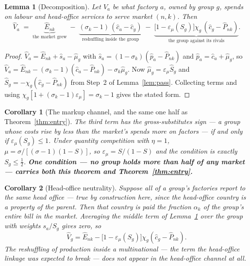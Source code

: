 \documentclass[11pt]{article}
\theoremstyle{plain}
\newtheorem{lemma}{Lemma}
\newtheorem{corollary}{Corollary}
\theoremstyle{remark}
\theoremstyle{definition}
\begin{document}
\begin{lemma}[Decomposition]\label{lem:decomp}
Let $V_a$ be what factory $a$, owned by group $g$, spends on labour and head-office
services to serve market $(n,k)$. Then
\[
  \hat V_a \;=\;
  \underbrace{\hat E_{nk}}_{\text{the market grew}}
  \;-\;\underbrace{(\sigma_k-1)\,(\hat c_a-\hat c_g)}_{\text{reshuffling inside the group}}
  \;-\;\underbrace{\big[1-\varepsilon_\mu(S_g)\big]\chi_g\,(\hat c_g-\hat P_{nk})}_{\text{the group against its rivals}} .
\]
\end{lemma}

\begin{proof}
$\hat V_a=\hat E_{nk}+\hat s_a-\hat\mu_g$ with $\hat s_a=(1-\sigma_k)(\hat p_a-\hat
P_{nk})$ and $\hat p_a=\hat c_a+\hat\mu_g$, so $\hat V_a=\hat E_{nk}
-(\sigma_k-1)(\hat c_a-\hat P_{nk})-\sigma_k\hat\mu_g$. Now
$\hat\mu_g=\varepsilon_\mu\hat S_g$ and $\hat S_g=-\chi_g(\hat c_g-\hat P_{nk})$ from
Step~2 of Lemma~\ref{lem:pass}. Collecting terms and using
$\chi_g[1+(\sigma_k-1)\varepsilon_\mu]=\sigma_k-1$ gives the stated form.
\end{proof}

\begin{corollary}[The markup channel, and the same one half as Theorem~\ref{thm:entry}]
\label{cor:half}
The third term has the gross-substitutes sign --- a group whose costs rise by less than
the market's spends \emph{more} on factors --- if and only if
$\varepsilon_\mu(S_g)\le1$. Under quantity competition with $\eta=1$,
$\mu=\sigma/[(\sigma-1)(1-S)]$, so $\varepsilon_\mu=S/(1-S)$ and the condition is
exactly $S_g\le\frac12$. \textbf{One condition --- no group holds more than half of any
market --- carries both this theorem and Theorem~\ref{thm:entry}.}
\end{corollary}

\begin{corollary}[Head-office neutrality]\label{cor:hqneutral}
Suppose all of a group's factories report to the same head office --- true by
construction here, since the head-office country is a property of the parent. Then
that country is paid the fraction $\alpha_k$ of the group's \emph{entire} bill in the
market. Averaging the middle term of Lemma~\ref{lem:decomp}
over the group with weights $s_a/S_g$ gives zero, so
\[
  \hat V_g=\hat E_{nk}-\big[1-\varepsilon_\mu(S_g)\big]\chi_g(\hat c_g-\hat P_{nk}) .
\]
The reshuffling of production \emph{inside} a multinational --- the term the
head-office linkage was expected to break --- does not appear in the head-office
channel at all.
\end{corollary}
\end{document}
